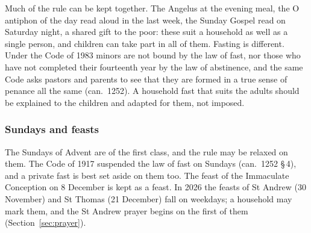 Much of the rule can be kept together. The Angelus at the evening meal, the O antiphon of the day
read aloud in the last week, the Sunday Gospel read on Saturday night, a shared gift to the poor:
these suit a household as well as a single person, and children can take part in all of them.
Fasting is different. Under the Code of 1983 minors are not bound by the law of fast, nor those who
have not completed their fourteenth year by the law of abstinence, and the same Code asks pastors and parents to see that they are formed in a true
sense of penance all the same (can.~1252). A
household fast that suits the adults should be explained to the children and adapted for them, not
imposed.

\subsubsection{Sundays and feasts}

The Sundays of Advent are of the first class, and the rule may be relaxed on them. The Code of
1917 suspended the law of fast on Sundays (can.~1252 \S\,4), and a private fast is best set aside
on them too. The feast of the Immaculate Conception on 8 December is kept
as a feast. In 2026 the feasts of St Andrew (30 November) and St Thomas (21 December) fall on
weekdays; a household may mark them, and the St Andrew prayer begins on the first of them
(Section~\ref{sec:prayer}).
